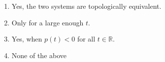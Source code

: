 \documentclass[twoside,10pt,a4paper]{article}
\begin{document}
\begin{enumerate}[label=(\alph*)]
	\item Yes, the two systems are topologically equivalent.
	\item Only for a large enough $t$.
	\item Yes, when $p(t) < 0$ for all $t \in \mathbb{R}$.
	\item None of the above
\end{enumerate}
\end{document}
